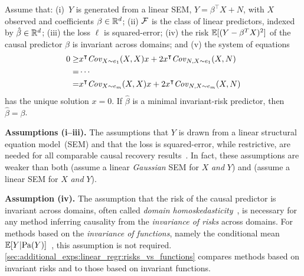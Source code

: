 \documentclass{article}
\begin{document}
%
%
%
%
%
\begin{theorem}
    \label{thm:causal_predictor}
    Assume that: (i)~$Y$ is generated from a linear SEM, $Y = \beta^\intercal X + N$, with $X$ observed and coefficients $\beta \in \mathbb{R}^d$; (ii) $\mathcal{F}$ is the class of linear predictors, indexed by $\hat\beta \in \mathbb{R}^d$; (iii) the loss $\ell$ is squared-error; (iv) the risk $\mathbb{E}[(Y - \beta^TX)^2]$ of the causal predictor $\beta$ is invariant
    across domains; and (v)  the system of equations
    \begin{align}
        \notag
        0 \geq
        & x^\intercal \text{\emph{Cov}}_{X \sim e_1}(X, X) x
            + 2 x^\intercal \text{\emph{Cov}}_{N,X \sim e_1} (X, N) \\
        \notag
        = & \cdots \\
        \label{eq:causal_recovery_equations_main}
        = & x^\intercal \text{\emph{Cov}}_{X \sim e_m}(X, X) x
            + 2 x^\intercal \text{\emph{Cov}}_{N,X \sim e_m} (X, N)
    \end{align}
    has the unique solution $x = 0$. If $\hat\beta$ is a minimal invariant-risk predictor, then $\hat\beta=\beta$.
\end{theorem}%

\textbf{Assumptions (i--iii).}  The assumptions that $Y$ is drawn from a linear structural equation model~(SEM) and that the loss is squared-error, while restrictive, are needed for all comparable causal recovery results~\citep{peters2016causal, krueger21rex}. In fact, these assumptions are weaker than both \citet[Thm.~2]{peters2016causal} (assume a linear \emph{Gaussian} SEM for $X$ \emph{and} $Y$) and  \citet[Thm.~1]{krueger21rex} (assume a linear SEM for $X$ \emph{and} $Y$). 

\textbf{Assumption (iv).} The assumption that the risk of the causal predictor is invariant across domains, often called \emph{domain homoskedasticity}~\citep{krueger21rex}, is necessary for any method inferring causality from the \emph{invariance of risks} across domains.
%
%
%
For methods based on the \emph{invariance of functions}, namely the conditional mean $\operatorname{\mathbb{E}}[Y|\mathrm{Pa}(Y)]$~\citep{arjovsky2020invariant, yin2021optimization}, this assumption is not required. \cref{sec:additional_exps:linear_regr:risks_vs_functions} compares methods based on invariant risks and to those based on invariant functions.
\end{document}
